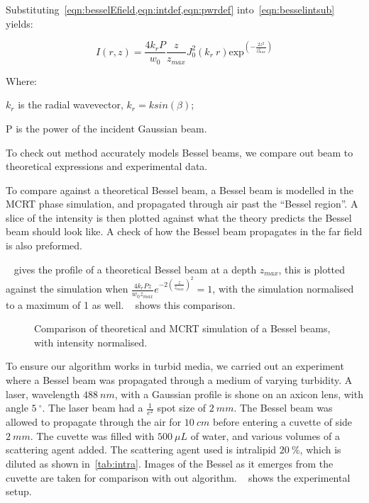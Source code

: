 Substituting~\cref{eqn:besselEfield,eqn:intdef,eqn:pwrdef} into~\cref{eqn:besselintsub} yields:

\begin{equation}
    I(r,z)=\frac{4k_rP}{w_0}\frac{z}{z_{max}}J_0^2\left(k_r\ r\right)\text{exp}^{\left(-\frac{2z^2}{z^2_{max}}\right)}
    \label{eqn:besselInt}
\end{equation}


\noindent Where:

    \indent $k_r$ is the radial wavevector, $k_r=k sin(\beta)$;

    \indent P is the power of the incident Gaussian beam.

    \medskip

To check out method accurately models Bessel beams, we compare out beam to theoretical expressions and experimental data.

To compare against a theoretical Bessel beam, a Bessel beam is modelled in the MCRT phase simulation, and propagated through air past the ``Bessel region''. 
A slice of the intensity is then plotted against what the theory predicts the Bessel beam should look like. 
A check of how the Bessel beam propagates in the far field is also preformed.


~ gives the profile of a theoretical Bessel beam at a depth $z_{max}$, this is plotted against the simulation when $\tfrac{4k_rPz}{w_0z_{max}}e^{-2\left(\tfrac{z}{z_{max}}\right)^2}=1$, with the simulation normalised to a maximum of 1 as well. ~ shows this comparison.


\begin{figure}[!ht]
    \centering
    \caption{Comparison of theoretical and MCRT simulation of a Bessel beams, with intensity normalised.}
    \label{fig:besselCompare}
\end{figure}

To ensure our algorithm works in turbid media, we carried out an experiment where a Bessel beam was propagated through a medium of varying turbidity.
A laser, wavelength $488~nm$, with a Gaussian profile is shone on an axicon lens, with angle $5~^{\circ}$.
The laser beam had a $\tfrac{1}{e^2}$ spot size of $2~mm$. 
The Bessel beam was allowed to propagate through the air for $10~cm$ before entering a cuvette of side $2~mm$.
The cuvette was filled with $500~\mu L$ of water, and various volumes of a scattering agent added.
The scattering agent used is intralipid $20~\%$, which is diluted as shown in~\cref{tab:intra}.
Images of the Bessel as it emerges from the cuvette are taken for comparison with out algorithm.
~ shows the experimental setup.

